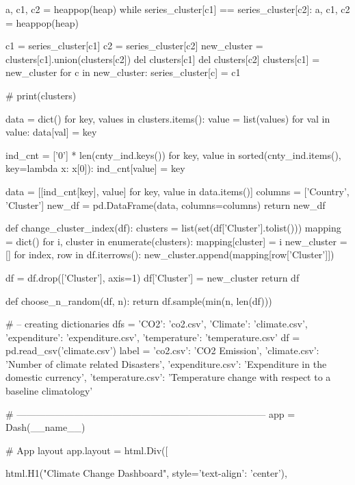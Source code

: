         a, c1, c2 = heappop(heap)
        while series_cluster[c1] == series_cluster[c2]:
            a, c1, c2 = heappop(heap)

        c1 = series_cluster[c1]
        c2 = series_cluster[c2]
        new_cluster = clusters[c1].union(clusters[c2])
        del clusters[c1]
        del clusters[c2]
        clusters[c1] = new_cluster
        for c in new_cluster:
            series_cluster[c] = c1

        # print(clusters)

    data = dict()
    for key, values in clusters.items():
        value = list(values)
        for val in value:
            data[val] = key

    ind_cnt = ['0'] * len(cnty_ind.keys())
    for key, value in sorted(cnty_ind.items(), key=lambda x: x[0]):
        ind_cnt[value] = key

    data = [[ind_cnt[key], value] for key, value in data.items()]
    columns = ['Country', 'Cluster']
    new_df = pd.DataFrame(data, columns=columns)
    return new_df


def change_cluster_index(df):
    clusters = list(set(df['Cluster'].tolist()))
    mapping = dict()
    for i, cluster in enumerate(clusters):
        mapping[cluster] = i
    new_cluster = []
    for index, row in df.iterrows():
        new_cluster.append(mapping[row['Cluster']])

    df = df.drop(['Cluster'], axis=1)
    df['Cluster'] = new_cluster
    return df


def choose_n_random(df, n):
    return df.sample(min(n, len(df)))


# -- creating dictionaries
dfs = {
    'CO2': 'co2.csv',
    'Climate': 'climate.csv',
    'expenditure': 'expenditure.csv',
    'temperature': 'temperature.csv'
}
df = pd.read_csv('climate.csv')
label = {
    'co2.csv': 'CO2 Emission',
    'climate.csv': 'Number of climate related Disasters',
    'expenditure.csv': 'Expenditure in the domestic currency',
    'temperature.csv': 'Temperature change with respect to a baseline climatology'
}

# ------------------------------------------------------------------------------
app = Dash(__name__)

# App layout
app.layout = html.Div([

    html.H1("Climate Change Dashboard", style={'text-align': 'center'}),

